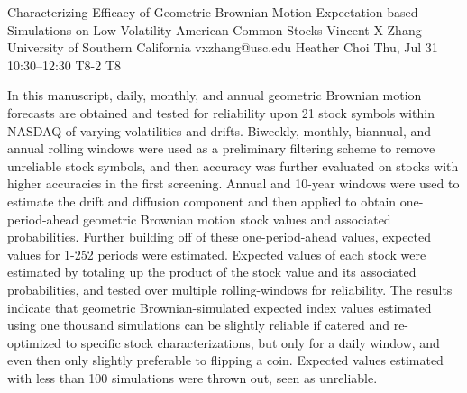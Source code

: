 \begin{talk}
  {Characterizing Efficacy of Geometric Brownian Motion Expectation-based Simulations on Low-Volatility American Common Stocks}%
  {Vincent X Zhang}%
  {University of Southern California}%
  {vxzhang@usc.edu}%
  {Heather Choi}%
  {}%
  {Thu, Jul 31 10:30–12:30}%
  {T8-2}%
  {T8}%
  
				
			
In this manuscript, daily, monthly, and annual geometric Brownian motion forecasts are obtained and tested for reliability upon 21 stock symbols within NASDAQ of varying volatilities and drifts. Biweekly, monthly, biannual, and annual rolling windows were used as a preliminary filtering scheme to remove unreliable stock symbols, and then accuracy was further evaluated on stocks with higher accuracies in the first screening. Annual and 10-year windows were used to estimate the drift and diffusion component and then applied to obtain one-period-ahead geometric Brownian motion stock values and associated probabilities. Further building off of these one-period-ahead values, expected values for 1-252 periods were estimated. Expected values of each stock were estimated by totaling up the product of the stock value and its associated probabilities, and tested over multiple rolling-windows for reliability. The results indicate that geometric Brownian-simulated expected index values estimated using one thousand simulations can be slightly reliable if catered and re-optimized to specific stock characterizations, but only for a daily window, and even then only slightly preferable to flipping a coin. Expected values estimated with less than 100 simulations were thrown out, seen as unreliable.


\medskip


\end{talk}
